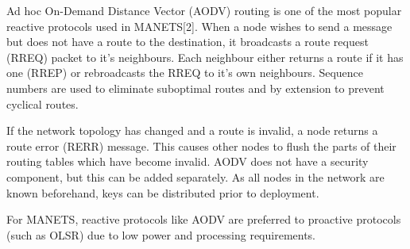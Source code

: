 \documentclass[landscape,a0paper,fontscale=0.285]{baposter} %
\begin{document}
\begin{poster}
{\begin{multicols}{2}
Ad hoc On-Demand Distance Vector (AODV) routing is one of the most popular reactive protocols used in MANETS[2]. When a node wishes to send a message but does not have a route to the destination, it broadcasts a route request (RREQ) packet to it's neighbours. Each neighbour either returns a route if it has one (RREP) or rebroadcasts the RREQ to it's own neighbours. Sequence numbers are used to eliminate suboptimal routes and by extension to prevent cyclical routes.


If the network topology has changed and a route is invalid, a node returns a route error (RERR) message. This causes other nodes to flush the parts of their routing tables which have become invalid. AODV does not have a security component, but this can be added separately. As all nodes in the network are known beforehand, keys can be distributed prior to deployment.
\newline

For MANETS, reactive protocols like AODV are preferred to proactive protocols (such as OLSR) due to low power and processing requirements.
\end{multicols}
}





\end{poster}
\end{document}
